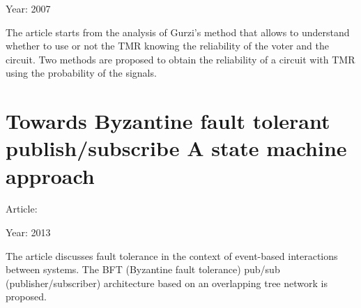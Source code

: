 {{		Year: 2007
		
		The article starts from the analysis of Gurzi's method that allows to understand whether to use or not the TMR knowing the reliability of the voter and the circuit. Two methods are proposed to obtain the reliability of a circuit with TMR using the probability of the signals.
		
	}
	\section{Towards Byzantine fault tolerant publish/subscribe A state machine approach}{
		Article: \cite{Towards_Byzantine_fault_tolerant_publish_subscribe_A_state_machine_approach}
		
		Year: 2013
		
		The article discusses fault tolerance in the context of event-based interactions between systems. The BFT (Byzantine fault tolerance) pub/sub (publisher/subscriber) architecture based on an overlapping tree network is proposed.	
	}
}